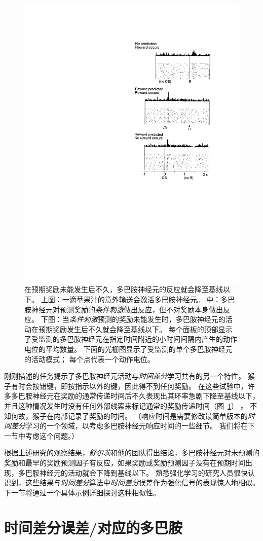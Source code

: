 \begin{figure}[!htb]
	\centering
	\includegraphics[width=0.45\linewidth]{chap12/fig_12_4}
	\caption{在预期奖励未能发生后不久，多巴胺神经元的反应就会降至基线以下。
		上图：一滴苹果汁的意外输送会激活多巴胺神经元。
		中：多巴胺神经元对预测奖励的\textit{条件刺激}做出反应，但不对奖励本身做出反应。
		下图：当\textit{条件刺激}预测的奖励未能发生时，多巴胺神经元的活动在预期奖励发生后不久就会降至基线以下。
		每个面板的顶部显示了受监测的多巴胺神经元在指定时间附近的小时间间隔内产生的动作电位的平均数量。
		下面的光栅图显示了受监测的单个多巴胺神经元的活动模式；
		每个点代表一个动作电位\cite{schultz1997neural}。
		\label{fig:12_4}}
\end{figure}


刚刚描述的任务揭示了多巴胺神经元活动与\textit{时间差分}学习共有的另一个特性。
猴子有时会按错键，即按指示以外的键，因此得不到任何奖励。
在这些试验中，许多多巴胺神经元在奖励的通常传递时间后不久表现出其环率急剧下降至基线以下，并且这种情况发生时没有任何外部线索来标记通常的奖励传递时间（图~\ref{fig:12_4}） 。
不知何故，猴子在内部记录了奖励的时间。
（响应时间是需要修改最简单版本的\textit{时间差分}学习的一个领域，以考虑多巴胺神经元响应时间的一些细节。
我们将在下一节中考虑这个问题。）


根据上述研究的观察结果，\textit{舒尔茨}和他的团队得出结论，多巴胺神经元对未预测的奖励和最早的奖励预测因子有反应，如果奖励或奖励预测因子没有在预期时间出现，多巴胺神经元的活动就会下降到基线以下。
熟悉强化学习的研究人员很快认识到，这些结果与\textit{时间差分}算法中\textit{时间差分}误差作为强化信号的表现惊人地相似。
下一节将通过一个具体示例详细探讨这种相似性。


\section{时间差分误差/对应的多巴胺} \label{sec:td_dopamine}

